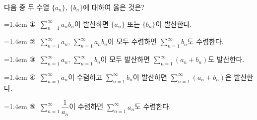 다음 중 두 수열 $\{a_n\}$, $\{b_n\}$에 대하여 옳은 것은?
\par\medskip\par\noindent\hangindent=1.4em {\small ①}\ $\displaystyle\sum_{n=1}^{\infty} a_nb_n$이 발산하면 $\{a_n\}$ 또는 $\{b_n\}$이 발산한다.\par\noindent\hangindent=1.4em {\small ②}\ $\displaystyle\sum_{n=1}^{\infty} a_n$, $\displaystyle\sum_{n=1}^{\infty} a_nb_n$이 모두 수렴하면 $\displaystyle\sum_{n=1}^{\infty} b_n$도 수렴한다.\par\noindent\hangindent=1.4em {\small ③}\ $\displaystyle\sum_{n=1}^{\infty} a_n$, $\displaystyle\sum_{n=1}^{\infty} b_n$이 모두 발산하면 $\displaystyle\sum_{n=1}^{\infty} (a_n+b_n)$도 발산한다.\par\noindent\hangindent=1.4em {\small ④}\ $\displaystyle\sum_{n=1}^{\infty} a_n$이 수렴하고 $\displaystyle\sum_{n=1}^{\infty} b_n$이 발산하면 $\displaystyle\sum_{n=1}^{\infty} (a_n+b_n)$은 발산한다.\par\noindent\hangindent=1.4em {\small ⑤}\ $\displaystyle\sum_{n=1}^{\infty} \dfrac{1}{a_n}$이 수렴하면 $\displaystyle\sum_{n=1}^{\infty} a_n$도 수렴한다.\par\medskip
